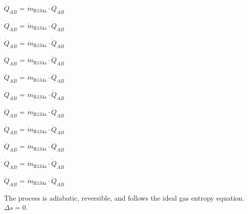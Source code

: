 \( \dot{Q}_{AB} \) = \( \dot{m}_{\text{R134a}} \cdot \dot{Q}_{AB} \)  

\( \dot{Q}_{AB} \) = \( \dot{m}_{\text{R134a}} \cdot \dot{Q}_{AB} \)  

\( \dot{Q}_{AB} \) = \( \dot{m}_{\text{R134a}} \cdot \dot{Q}_{AB} \)  

\( \dot{Q}_{AB} \) = \( \dot{m}_{\text{R134a}} \cdot \dot{Q}_{AB} \)  

\( \dot{Q}_{AB} \) = \( \dot{m}_{\text{R134a}} \cdot \dot{Q}_{AB} \)  

\( \dot{Q}_{AB} \) = \( \dot{m}_{\text{R134a}} \cdot \dot{Q}_{AB} \)  

\( \dot{Q}_{AB} \) = \( \dot{m}_{\text{R134a}} \cdot \dot{Q}_{AB} \)  

\( \dot{Q}_{AB} \) = \( \dot{m}_{\text{R134a}} \cdot \dot{Q}_{AB} \)  

\( \dot{Q}_{AB} \) = \( \dot{m}_{\text{R134a}} \cdot \dot{Q}_{AB} \)  

\( \dot{Q}_{AB} \) = \( \dot{m}_{\text{R134a}} \cdot \dot{Q}_{AB} \)  

\( \dot{Q}_{AB} \) = \( \dot{m}_{\text{R134a}} \cdot \dot{Q}_{AB} \)

The process is adiabatic, reversible, and follows the ideal gas entropy equation. \( \Delta s = 0 \).